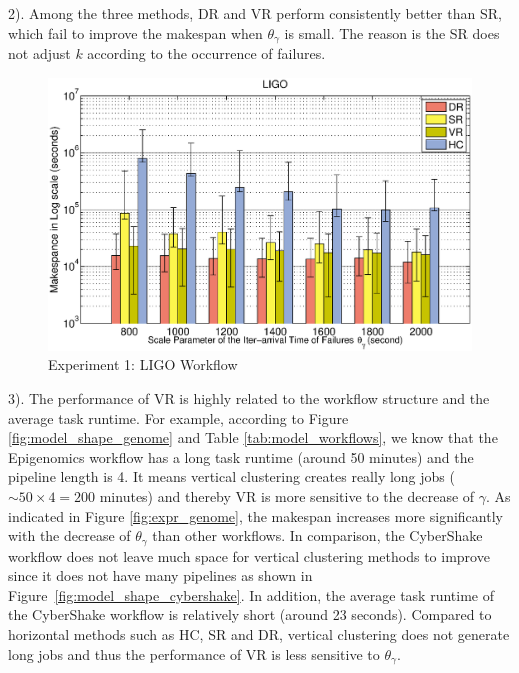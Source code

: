 2). Among the three methods, DR and VR perform consistently better than SR, which fail to improve the makespan when $\theta_{\gamma}$ is small. The reason is the SR does not adjust $k$ according to the occurrence of failures. 

\begin{figure}[!htb]
\centering
  \includegraphics[width=1\linewidth]{figures/tolerance/ligo.eps}
  \caption{Experiment 1: LIGO Workflow}
  \label{fig:expr_ligo}
\end{figure}

3). The performance of VR is highly related to the workflow structure and the average task runtime. For example, according to Figure \ref{fig:model_shape_genome} and Table \ref{tab:model_workflows}, we know that the Epigenomics workflow has a long task runtime (around 50 minutes) and the pipeline length is 4. It means vertical clustering creates really long jobs ($\sim 50\times 4=200$ minutes) and thereby VR is more sensitive to the decrease of $\gamma$. As indicated in Figure \ref{fig:expr_genome}, the makespan increases more significantly with the decrease of $\theta_{\gamma}$ than other workflows. In comparison, the CyberShake workflow does not leave much space for vertical clustering methods to improve since it does not have many pipelines as shown in Figure~\ref{fig:model_shape_cybershake}. In addition, the average task runtime of the CyberShake workflow is relatively short (around 23 seconds). Compared to horizontal methods such as HC, SR and DR, vertical clustering does not generate long jobs and thus the performance of VR is less  sensitive to $\theta_{\gamma}$. 




